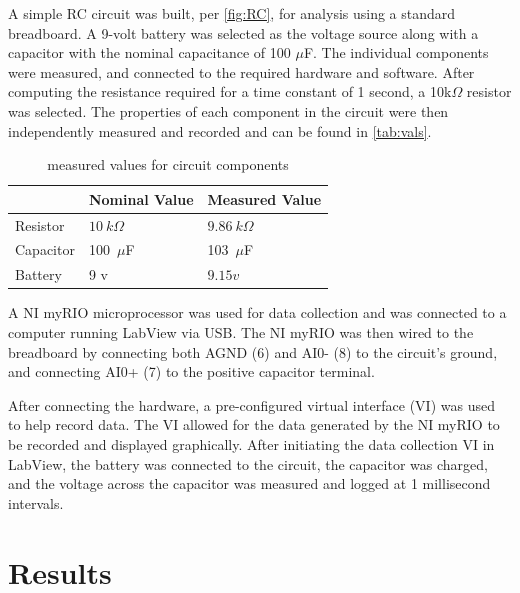 \documentclass[10pt,twocolumn]{article}
\begin{document}
A simple RC circuit was built, per \autoref{fig:RC}, for analysis using a standard breadboard. A 9-volt battery was selected as the voltage source along with a capacitor with the nominal capacitance of 100 $\mu$F. The individual components were measured, and connected to the required hardware and software. After computing the resistance required for a time constant of 1 second, a 10k$\Omega$ resistor was selected. The properties of each component in the circuit were then independently measured and recorded and can be found in \autoref{tab:vals}.

\begin{table}[h!]
	\begin{tabularx}{1\linewidth}{ lXX }
		\hline
		 & \textbf{Nominal Value} & \textbf{Measured Value} \\
		\hline
		Resistor & $10\ k \Omega$ & $9.86 \ k \Omega$ \\
		Capacitor & 100\ $\mu$F  & 103\ $\mu$F \\
		Battery & 9 v & $9.15 v$ \\
		\hline
	\end{tabularx}
	\caption{measured values for circuit components}
	\label{tab:vals}
\end{table}

	
	A NI myRIO microprocessor was used for data collection and was connected to a computer running LabView via USB. The NI myRIO was then wired to the breadboard by connecting both AGND (6) and AI0- (8) to the circuit's ground, and connecting AI0+ (7) to the positive capacitor terminal.
	 
	After connecting the hardware, a pre-configured virtual interface (VI) was used to help record data. The VI allowed for the data generated by the NI myRIO to be recorded and displayed graphically. After initiating the data collection VI in LabView, the battery was connected to the circuit, the capacitor was charged, and the voltage across the capacitor was measured and logged at 1 millisecond intervals.  

\section{Results}
\end{document}
